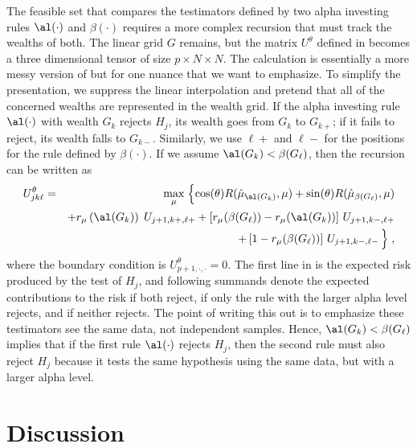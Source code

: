 \documentclass{gSCS2e}
\begin{document}
 The feasible set that compares the testimators defined by two alpha investing
 rules $\al(\cdot)$ and $\beta(\cdot)$ requires a more complex recursion that
 must track the wealths of both.  The linear grid $G$ remains, but the matrix
 $U^\theta$ defined in  becomes a three dimensional tensor of size
 $p \times N \times N$.  The calculation is essentially a more messy version of
  but for one nuance that we want to emphasize.  To simplify the
 presentation, we suppress the linear interpolation and pretend that all of the
 concerned wealths are represented in the wealth grid.  If the alpha investing
 rule $\al(\cdot)$ with wealth $G_k$ rejects $H_j$, its wealth goes from $G_k$
 to $G_{k+}$; if it fails to reject, its wealth falls to $G_{k-}$.  Similarly,
 we use $\ell+$ and $\ell-$ for the positions for the rule defined by
 $\beta(\cdot)$.  If we assume $\al(G_k) < \beta(G_\ell)$, then the recursion
 can be written as
 \begin{eqnarray}
   U^\theta_{jk\ell} &=&  \max_\mu \;\Bigl\{
     \cos(\theta) R(\hat\mu_{\al(G_k)}, \mu) 
       + \sin(\theta) R(\hat\mu_{\beta(G_\ell)},\mu) \cr
     & & + r_\mu\left(\al(G_k)\right) \; U_{j+1,k+,\ell+} 
         + \left[ r_\mu(\beta(G_\ell)) - r_\mu(\al(G_k)) \right] \, U_{j+1,k-,\ell+} \cr
     & & + \left[1-r_\mu(\beta(G_\ell))\right] \, U_{j+1,k-,\ell-} \, \Bigr\}\;,
 \label{eq:Ujkl}
 \end{eqnarray}
 where the boundary condition is $U_{p+1,\cdot,\cdot}^\theta= 0$.  The first
 line in  is the expected risk produced by the test of $H_j$, and
 following summands denote the expected contributions to the risk if both
 reject, if only the rule with the larger alpha level rejects, and if neither
 rejects.  The point of writing this out is to emphasize these testimators see
 the same data, not independent samples.  Hence, $\al(G_k) < \beta(G_\ell)$
 implies that if the first rule $\al(\cdot)$ rejects $H_j$, then the second rule
 must also reject $H_j$ because it tests the same hypothesis using the same
 data, but with a larger alpha level.


\section{ Discussion }
\end{document}

